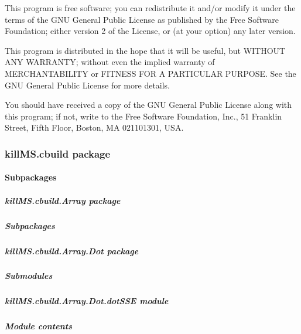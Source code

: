 \documentclass[letterpaper,10pt,english]{sphinxmanual}
\begin{document}
\sphinxAtStartPar
This program is free software; you can redistribute it and/or
modify it under the terms of the GNU General Public License
as published by the Free Software Foundation; either version 2
of the License, or (at your option) any later version.

\sphinxAtStartPar
This program is distributed in the hope that it will be useful,
but WITHOUT ANY WARRANTY; without even the implied warranty of
MERCHANTABILITY or FITNESS FOR A PARTICULAR PURPOSE.  See the
GNU General Public License for more details.

\sphinxAtStartPar
You should have received a copy of the GNU General Public License
along with this program; if not, write to the Free Software
Foundation, Inc., 51 Franklin Street, Fifth Floor, Boston, MA  02110\sphinxhyphen{}1301, USA.

\sphinxstepscope


\subsubsection{killMS.cbuild package}
\label{\detokenize{api/killMS.cbuild:killms-cbuild-package}}\label{\detokenize{api/killMS.cbuild::doc}}

\paragraph{Subpackages}
\label{\detokenize{api/killMS.cbuild:subpackages}}
\sphinxstepscope


\subparagraph{killMS.cbuild.Array package}
\label{\detokenize{api/killMS.cbuild.Array:killms-cbuild-array-package}}\label{\detokenize{api/killMS.cbuild.Array::doc}}

\subparagraph{Subpackages}
\label{\detokenize{api/killMS.cbuild.Array:subpackages}}
\sphinxstepscope


\subparagraph{killMS.cbuild.Array.Dot package}
\label{\detokenize{api/killMS.cbuild.Array.Dot:killms-cbuild-array-dot-package}}\label{\detokenize{api/killMS.cbuild.Array.Dot::doc}}

\subparagraph{Submodules}
\label{\detokenize{api/killMS.cbuild.Array.Dot:submodules}}

\subparagraph{killMS.cbuild.Array.Dot.dotSSE module}
\label{\detokenize{api/killMS.cbuild.Array.Dot:killms-cbuild-array-dot-dotsse-module}}

\subparagraph{Module contents}
\label{\detokenize{api/killMS.cbuild.Array.Dot:module-killMS.cbuild.Array.Dot}}\label{\detokenize{api/killMS.cbuild.Array.Dot:module-contents}}
\end{document}
